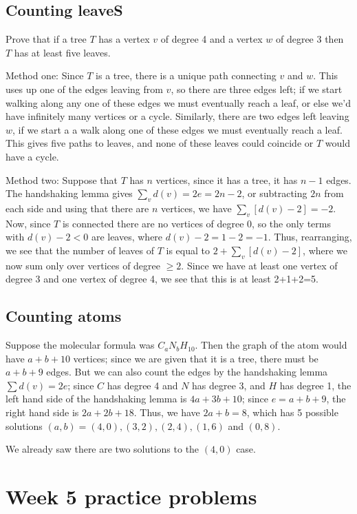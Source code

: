 \documentclass{amsart}
\begin{document}
\subsection{Counting leaveS}

Prove that if a tree $T$ has a vertex $v$ of degree 4 and a vertex $w$ of degree $3$ then $T$ has at least five leaves.

Method one: Since $T$ is a tree, there is a unique path connecting $v$ and $w$.  This uses up one of the edges leaving from $v$, so there are three edges left; if we start walking along any one of these edges we must eventually reach a leaf, or else we'd have infinitely many vertices or a cycle.  Similarly, there are two edges left leaving $w$, if we start a a walk along one of these edges we must eventually reach a leaf.  This gives five paths to leaves, and none of these leaves could coincide or $T$ would have a cycle.

Method two: Suppose that $T$ has $n$ vertices, since it has a tree, it has $n-1$ edges.  The handshaking lemma gives $\sum_v d(v)=2e=2n-2$, or subtracting $2n$ from each side and using that there are $n$ vertices, we have $\sum_v [d(v)-2]=-2$.  Now, since $T$ is connected there are no vertices of degree 0, so the only terms with $d(v)-2<0$ are leaves, where $d(v)-2=1-2=-1$.  Thus, rearranging, we see that the number of leaves of $T$ is equal to $2+\sum_v [d(v)-2]$, where we now sum only over vertices of degree $\geq 2$.  Since we have at least one vertex of degree 3 and one vertex of degree 4, we see that this is at least 2+1+2=5.

\subsection{Counting atoms}
Suppose the molecular formula was $C_aN_bH_{10}$.  Then the graph of the atom would have $a+b+10$ vertices; since we are given that it is a tree, there must be $a+b+9$ edges.  But we can also count the edges by the handshaking lemma $\sum d(v)=2e$; since $C$ has degree 4 and $N$ has degree 3, and $H$ has degree 1, the left hand side of the handshaking lemma is $4a+3b+10$; since $e=a+b+9$, the right hand side is $2a+2b+18$.  Thus, we have $2a+b=8$, which has 5 possible solutions $(a,b)=(4,0), (3,2), (2,4), (1,6)$ and $(0,8)$.

We already saw there are two solutions to the $(4,0)$ case.  


\section{Week 5 practice problems}
\end{document}
